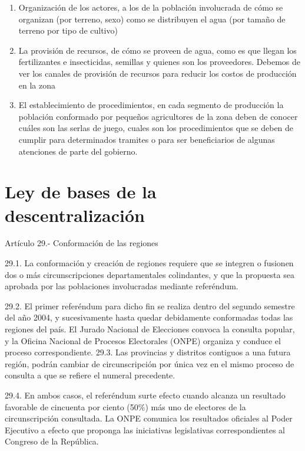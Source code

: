 \documentclass[
  letterpaper,
  DIV=11,
  numbers=noendperiod]{scrartcl}
\providecommand{\tightlist}{%
  \setlength{\itemsep}{0pt}\setlength{\parskip}{0pt}}\usepackage{longtable,booktabs,array}
\begin{document}
\begin{enumerate}
\def\labelenumi{\arabic{enumi}.}
\tightlist
\item
  Organización de los actores, a los de la población involucrada de cómo
  se organizan (por terreno, sexo) como se distribuyen el agua (por
  tamaño de terreno por tipo de cultivo)
\item
  La provisión de recursos, de cómo se proveen de agua, como es que
  llegan los fertilizantes e insecticidas, semillas y quienes son los
  proveedores. Debemos de ver los canales de provisión de recursos para
  reducir los costos de producción en la zona
\item
  El establecimiento de procedimientos, en cada segmento de producción
  la población conformado por pequeños agricultores de la zona deben de
  conocer cuáles son las serlas de juego, cuales son los procedimientos
  que se deben de cumplir para determinados tramites o para ser
  beneficiarios de algunas atenciones de parte del gobierno.
\end{enumerate}

\hypertarget{ley-de-bases-de-la-descentralizaciuxf3n}{%
\section{Ley de bases de la
descentralización}\label{ley-de-bases-de-la-descentralizaciuxf3n}}

Artículo 29.- Conformación de las regiones

29.1. La conformación y creación de regiones requiere que se integren o
fusionen dos o más circunscripciones departamentales colindantes, y que
la propuesta sea aprobada por las poblaciones involucradas mediante
referéndum.

29.2. El primer referéndum para dicho fin se realiza dentro del segundo
semestre del año 2004, y sucesivamente hasta quedar debidamente
conformadas todas las regiones del país. El Jurado Nacional de
Elecciones convoca la consulta popular, y la Oficina Nacional de
Procesos Electorales (ONPE) organiza y conduce el proceso
correspondiente. 29.3. Las provincias y distritos contiguos a una futura
región, podrán cambiar de circunscripción por única vez en el mismo
proceso de consulta a que se refiere el numeral precedente.

29.4. En ambos casos, el referéndum surte efecto cuando alcanza un
resultado favorable de cincuenta por ciento (50\%) más uno de electores
de la circunscripción consultada. La ONPE comunica los resultados
oficiales al Poder Ejecutivo a efecto que proponga las iniciativas
legislativas correspondientes al Congreso de la República.
\end{document}
